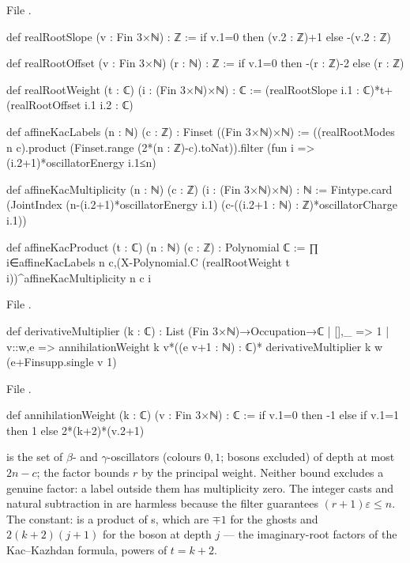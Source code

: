 \noindent File .
\begin{leancode}
def realRootSlope (v : Fin 3×ℕ) : ℤ := if v.1=0 then (v.2 : ℤ)+1 else -(v.2 : ℤ)

def realRootOffset (v : Fin 3×ℕ) (r : ℕ) : ℤ :=
  if v.1=0 then -(r : ℤ)-2 else (r : ℤ)

def realRootWeight (t : ℂ) (i : (Fin 3×ℕ)×ℕ) : ℂ :=
  (realRootSlope i.1 : ℂ)*t+(realRootOffset i.1 i.2 : ℂ)

def affineKacLabels (n : ℕ) (c : ℤ) : Finset ((Fin 3×ℕ)×ℕ) :=
  ((realRootModes n c).product (Finset.range (2*(n : ℤ)-c).toNat)).filter
    (fun i => (i.2+1)*oscillatorEnergy i.1≤n)

def affineKacMultiplicity (n : ℕ) (c : ℤ) (i : (Fin 3×ℕ)×ℕ) : ℕ :=
  Fintype.card (JointIndex (n-(i.2+1)*oscillatorEnergy i.1)
    (c-((i.2+1 : ℕ) : ℤ)*oscillatorCharge i.1))

def affineKacProduct (t : ℂ) (n : ℕ) (c : ℤ) : Polynomial ℂ :=
  ∏ i∈affineKacLabels n c,(X-Polynomial.C (realRootWeight t i))^affineKacMultiplicity n c i
\end{leancode}
\noindent File .
\begin{leancode}
def derivativeMultiplier (k : ℂ) : List (Fin 3×ℕ)→Occupation→ℂ
  | [],_ => 1
  | v::w,e => annihilationWeight k v*((e v+1 : ℕ) : ℂ)*
      derivativeMultiplier k w (e+Finsupp.single v 1)
\end{leancode}
\noindent File .
\begin{leancode}
def annihilationWeight (k : ℂ) (v : Fin 3×ℕ) : ℂ :=
  if v.1=0 then -1 else if v.1=1 then 1 else 2*(k+2)*(v.2+1)
\end{leancode}

\begin{dictionary}
 is the set of $\beta$- and $\gamma$-oscillators (colours $0,1$; bosons excluded) of depth
at most $2n-c$; the factor  bounds $r$ by the principal weight. Neither bound
excludes a genuine factor: a label outside them has multiplicity zero. The integer casts and natural
subtraction in  are harmless because the filter guarantees
$(r+1)\varepsilon\le n$. The constant:  is a product of
s, which are $\mp1$ for the ghosts and $2(k+2)(j+1)$ for the boson at depth $j$ ---
the imaginary-root factors of the Kac--Kazhdan formula, powers of $t=k+2$.
\end{dictionary}

